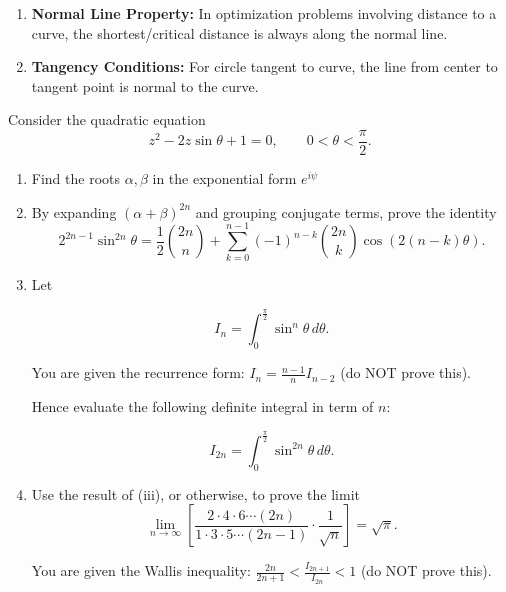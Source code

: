 \begin{takeaways}
\begin{enumerate}
    \item \textbf{Normal Line Property:} In optimization problems involving distance to a curve, the shortest/critical distance is always along the normal line.
    \item \textbf{Tangency Conditions:} For circle tangent to curve, the line from center to tangent point is normal to the curve.
\end{enumerate}
\end{takeaways}

\begin{problem}\label{prob:part2-wallis-07}

Consider the quadratic equation
\[z^2 - 2z\sin\theta + 1 = 0,\qquad 0<\theta<\frac{\pi}{2}.\]

\begin{enumerate}[label=(\roman*)]

    \item Find the roots $\alpha,\beta$ in the exponential form $e^{i\psi}$ 
    \item By expanding $(\alpha+\beta)^{2n}$ and grouping conjugate terms, prove the identity
    \[2^{2n-1}\sin^{2n}\theta = \frac{1}{2}\binom{2n}{n} + \sum_{k=0}^{n-1} (-1)^{n-k}\binom{2n}{k}\cos(2(n-k)\theta).
    \]
    \item 

    Let 

    \[ I_n = \int_0^{\frac{\pi}{2}} \sin^n \theta \, d\theta.
    \]

    You are given the recurrence form: $I_n = \frac{n-1}{n} I_{n-2}$ (do NOT prove this).

    Hence evaluate the following definite integral in term of $n$:
    
    \[ I_{2n} = \int_0^{\frac{\pi}{2}} \sin^{2n}\theta\,d\theta.
    \]
    
    \item Use the result of (iii), or otherwise, to prove the limit
    \[\lim_{n\to\infty}\left[\frac{2\cdot4\cdot6\cdots(2n)}{1\cdot3\cdot5\cdots(2n-1)}\cdot\frac{1}{\sqrt{n}}\right]=\sqrt{\pi}.
    \]

    You are given the Wallis inequality:
    $\frac{2n}{2n+1} < \frac{I_{2n+1}}{I_{2n}} < 1$ (do NOT prove this).

\end{enumerate}
\end{problem}


